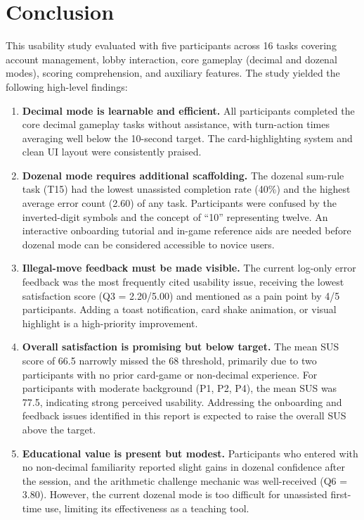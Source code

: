 \documentclass[12pt, titlepage]{article}
\begin{document}
\section{Conclusion}\label{sec:conclusion}

This usability study evaluated \progname{} with five participants across 16 tasks covering account management, lobby interaction, core gameplay (decimal and dozenal modes), scoring comprehension, and auxiliary features. The study yielded the following high-level findings:

\begin{enumerate}
  \item \textbf{Decimal mode is learnable and efficient.} All participants completed the core decimal gameplay tasks without assistance, with turn-action times averaging well below the 10-second target. The card-highlighting system and clean UI layout were consistently praised.

  \item \textbf{Dozenal mode requires additional scaffolding.} The dozenal sum-rule task (T15) had the lowest unassisted completion rate (40\%) and the highest average error count (2.60) of any task. Participants were confused by the inverted-digit symbols and the concept of ``10'' representing twelve. An interactive onboarding tutorial and in-game reference aids are needed before dozenal mode can be considered accessible to novice users.

  \item \textbf{Illegal-move feedback must be made visible.} The current log-only error feedback was the most frequently cited usability issue, receiving the lowest satisfaction score (Q3 = 2.20/5.00) and mentioned as a pain point by 4/5 participants. Adding a toast notification, card shake animation, or visual highlight is a high-priority improvement.

  \item \textbf{Overall satisfaction is promising but below target.} The mean SUS score of 66.5 narrowly missed the 68 threshold, primarily due to two participants with no prior card-game or non-decimal experience. For participants with moderate background (P1, P2, P4), the mean SUS was 77.5, indicating strong perceived usability. Addressing the onboarding and feedback issues identified in this report is expected to raise the overall SUS above the target.

  \item \textbf{Educational value is present but modest.} Participants who entered with no non-decimal familiarity reported slight gains in dozenal confidence after the session, and the arithmetic challenge mechanic was well-received (Q6 = 3.80). However, the current dozenal mode is too difficult for unassisted first-time use, limiting its effectiveness as a teaching tool.
\end{enumerate}
\end{document}
